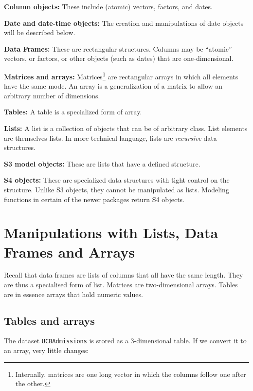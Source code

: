 \documentclass{tufte-book}\usepackage[]{graphicx}\usepackage[]{color}
\newcommand{\txtt}[1]{\texttt{#1}}
\begin{document}
\begin{trivlist}
\item[{\bf Column objects:}] These include (atomic) vectors,
factors, and dates.
\item[{\bf Date and date-time objects:}] The creation and
manipulations of date objects will be described below.
\item[{\bf Data Frames:}] These are rectangular structures.
    Columns may be ``atomic'' vectors, or
  factors, or other objects (such as dates) that are one-dimensional.
\item[{\bf Matrices and arrays:}] Matrices\footnote{Internally,
    matrices are one long vector in which the columns follow one after
    the other.} are rectangular arrays in which all elements have the
  same mode.  An array is a generalization of a matrix to allow
an arbitrary number of dimensions.
\item[{\bf Tables:}]  A table is a specialized form of array.
\item[{\bf Lists:}] A list is a collection of objects that can be of
  arbitrary class. List elements are themselves lists.  In
    more technical language, lists are {\em recursive} data structures.
\item[{\bf S3 model objects:}] These are lists that have a defined
  structure.
\item[{\bf S4 objects:}] These are specialized data structures with
  tight control on the structure. Unlike S3 objects, they cannot be
  manipulated as lists.  Modeling functions in certain of the newer
  packages return S4 objects.
\end{trivlist}

\section{Manipulations with Lists, Data Frames and Arrays}

Recall that data frames are lists of columns that all have the
same length.  They are thus a specialised form of list.  Matrices
are two-dimensional arrays.  Tables are in essence arrays that
hold numeric values.

\subsection{Tables and arrays}
The dataset \txtt{UCBAdmissions} is stored as a 3-dimensional
table.  If we convert it to an array, very little changes:
\end{document}
